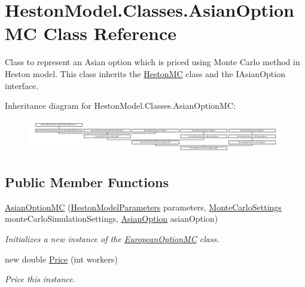 \hypertarget{class_heston_model_1_1_classes_1_1_asian_option_m_c}{}\section{Heston\+Model.\+Classes.\+Asian\+Option\+MC Class Reference}
\label{class_heston_model_1_1_classes_1_1_asian_option_m_c}


Class to represent an Asian option which is priced using Monte Carlo method in Heston model. This class inherits the \mbox{\hyperlink{class_heston_model_1_1_classes_1_1_heston_m_c}{Heston\+MC}} class and the I\+Asian\+Option interface.  


Inheritance diagram for Heston\+Model.\+Classes.\+Asian\+Option\+MC\+:\begin{figure}[H]
\begin{center}
\leavevmode
\includegraphics[height=1.465969cm]{class_heston_model_1_1_classes_1_1_asian_option_m_c}
\end{center}
\end{figure}
\subsection*{Public Member Functions}
\begin{DoxyCompactItemize}
\item 
\mbox{\hyperlink{class_heston_model_1_1_classes_1_1_asian_option_m_c_af3166ab5ed7a208cffc69e08e01b089b}{Asian\+Option\+MC}} (\mbox{\hyperlink{class_heston_model_1_1_classes_1_1_interface_classes_1_1_heston_model_parameters}{Heston\+Model\+Parameters}} parameters, \mbox{\hyperlink{class_heston_model_1_1_classes_1_1_interface_classes_1_1_monte_carlo_settings}{Monte\+Carlo\+Settings}} monte\+Carlo\+Simulation\+Settings, \mbox{\hyperlink{class_heston_model_1_1_classes_1_1_interface_classes_1_1_asian_option}{Asian\+Option}} asian\+Option)
\begin{DoxyCompactList}\small\item\em Initializes a new instance of the \mbox{\hyperlink{class_heston_model_1_1_classes_1_1_european_option_m_c}{European\+Option\+MC}} class. \end{DoxyCompactList}\item 
new double \mbox{\hyperlink{class_heston_model_1_1_classes_1_1_asian_option_m_c_a1be30279c4d68b1fa2e5cb60734c12cb}{Price}} (int workers)
\begin{DoxyCompactList}\small\item\em Price this instance. \end{DoxyCompactList}\end{DoxyCompactItemize}
